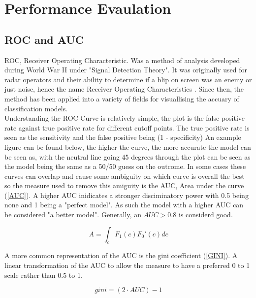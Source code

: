\section{Performance Evaulation} \label{sec:perf_eval}

\subsection*{ROC and AUC}
ROC, Receiver Operating Characteristic. Was a method of analysis developed during World War II under "Signal Detection Theory". It was originally used for radar operators and their ability to determine if a blip on screen was an enemy or just noise, hence the name Receiver Operating Characteristics \parencite{tape2000using}. Since then, the method has been applied into a variety of fields for visuallising the accuary of classification models. \\

Understanding the ROC Curve is relatively simple, the plot is the false positive rate against true positive rate for different cutoff points. The true positive rate is seen as the sensitivity and the false positive being (1 - specificity) An example figure can be found below, the higher the curve, the more accurate the model can be seen as, with the neutral line going 45 degrees through the plot can be seen as the model being the same as a 50/50 guess on the outcome. In some cases these curves can overlap and cause some ambiguity on which curve is overall the best so the measure used to remove this amiguity is the AUC, Area under the curve (\ref{AUC}). A higher AUC inidicates a stronger disciminatory power with 0.5 being none and 1 being a "perfect model". As such the model with a higher AUC can be considered "a better model". Generally, an $AUC > 0.8$ is considerd good.

\begin{equation}\label{AUC}
A = \int_{c}^{} F_1(c){F_0}'(c) dc
\end{equation}

A more common representation of the AUC is the gini coefficient (\ref{GINI}). A linear transformation of the AUC to allow the measure to have a preferred 0 to 1 scale rather than 0.5 to 1.

\begin{equation}\label{GINI}
gini = (2 \cdot AUC) - 1
\end{equation}

